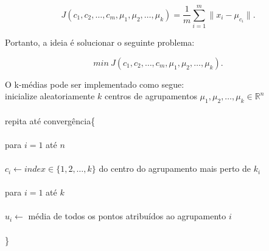 \begin{equation}
\label{e.kmeans_optimization}
J(c_1, c_2, \dots, c_m, \mu_1, \mu_2, \dots, \mu_k) = \frac{1}{m} \sum\limits_{i=1}^m \parallel x_i - \mu_{c_i} \parallel.	
\end{equation}

Portanto, a ideia é solucionar o seguinte problema:

\begin{equation}
min \ J(c_1, c_2, \dots, c_m, \mu_1, \mu_2, \dots, \mu_k).	
\end{equation}

O k-médias pode ser implementado como segue:\\

 \noindent inicialize aleatoriamente $k$ centros de agrupamentos $\mu_1, \mu_2, \dots, \mu_k \in \mathbb{R}^n$\\~\\
 repita até convergência\{ \\ \\
 \hspace*{25pt} para $i = 1$ até $n$\\~\\
 \hspace*{35pt} $c_i \leftarrow index \in \{1, 2, \dots, k\}$ do centro do agrupamento mais perto de $k_i$\\~\\
  \hspace*{25pt} para $i = 1$ até $k$\\~\\
  \hspace*{35pt} $u_i \leftarrow$ média de todos os pontos atribuídos ao agrupamento $i$\\ \\
 \hspace*{15pt} \} \\


